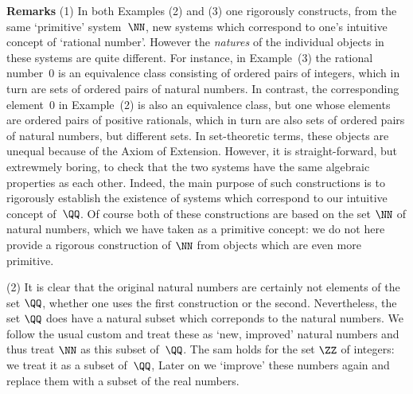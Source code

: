 {{{        {\bf Remarks} (1) In both Examples (2) and (3) one rigorously constructs, from the same `primitive' system~${\NN}$,
    new systems which correspond to one's intuitive concept of `rational number'.
    However the {\em natures} of the individual objects in these systems are quite different. For instance,
    in Example~(3) the rational number~$0$ is an equivalence class consisting of ordered pairs of integers, which in turn are sets of ordered pairs of natural numbers.
    In contrast, the corresponding element~$0$ in Example~(2) is also an equivalence class,
    but one whose elements are ordered pairs of positive rationals, which in turn are also sets of ordered pairs of natural numbers, but different sets.
    In set-theoretic terms, these objects are unequal because of the Axiom of Extension.
    However, it is straight-forward, but extrewmely boring, to check that the two systems have the same algebraic properties as each other.
    Indeed, the main purpose of such constructions is to rigorously establish the existence of systems which correspond to our intuitive concept of~${\QQ}$.
    Of course both of these constructions are based on the set ${\NN}$ of natural numbers, which we have taken as a primitive concept:
    we do not here provide a rigorous construction of ${\NN}$ from objects which are even more primitive.

\V

        (2) It is clear that the original natural numbers are certainly not elements of the set ${\QQ}$,
    whether one uses the first construction or the second. Nevertheless, the set ${\QQ}$ does have a natural subset which correponds to the natural numbers.
    We follow the usual custom and treat these as `new, improved' natural numbers and thus treat ${\NN}$ as this subset of~${\QQ}$.
    The sam holds for the set ${\ZZ}$ of integers: we treat it as a subset of~${{\QQ}}$,
    Later on we `improve' these numbers again and replace them with a subset of the real numbers.

}%

}}
